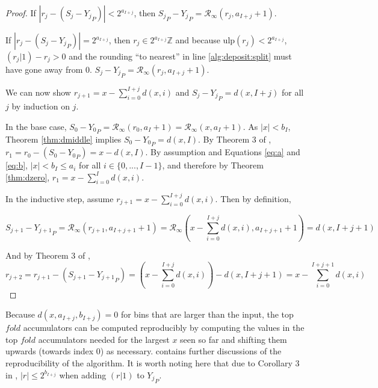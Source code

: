 \documentclass[12pt]{article}
\providecommand{\Z}{\ensuremath{\mathbb{Z}}}
\providecommand{\ulp}{\ensuremath{\text{ulp}}}
\providecommand{\roundtonearestinfty}{\ensuremath{\mathcal{R}_\text{$\infty$}}}
\theoremstyle{plain}
\numberwithin{equation}{section}
\begin{document}
\begin{proof}
        If $|r_j - (S_j - {Y_j}_P)| < 2^{a_{I + j}}$, then ${S_j}_P - {Y_j}_P = \roundtonearestinfty(r_j, a_{I + j} + 1)$.

        If $|r_j - (S_j - {Y_j}_P)| = 2^{a_{I + j}}$, then $r_j \in 2^{a_{I + j}}\Z$ and because $\ulp(r_j) < 2^{a_{I + j}}$, $(r_j | 1) - r_j > 0$ and the rounding ``to nearest'' in line \ref{alg:deposit:split} must have gone away from 0. $S_j - {Y_j}_P = \roundtonearestinfty(r_j, a_{I + j} + 1)$.

        We can now show $r_{j + 1} = x - \sum\limits_{i = 0}^{I + j}d(x, i)$ and $S_j - {Y_j}_P = d(x, I + j)$ for all $j$ by induction on $j$.

        In the base case, $S_0 - {Y_0}_P = \roundtonearestinfty(r_0, a_I + 1) = \roundtonearestinfty(x, a_I + 1)$. As $|x| < b_I$, Theorem \ref{thm:dmiddle} implies $S_0 - {Y_0}_P = d(x, I)$. By Theorem 3 of \cite{repsum}, $r_1 = r_0 - (S_0 - {Y_0}_P) = x - d(x,I)$. By assumption and Equations \ref{eq:a} and \ref{eq:b}, $|x| < b_I \leq a_{i}$ for all $i \in \{0, ..., I - 1\}$, and therefore by Theorem \ref{thm:dzero}, $r_1 = x - \sum\limits_{i = 0}^Id(x, i)$.

        In the inductive step, assume $r_{j + 1} = x - \sum\limits_{i = 0}^{I + j}d(x, i)$. Then by definition,

        \begin{equation*}
          S_{j + 1} - {Y_{j + 1}}_P = \roundtonearestinfty(r_{j + 1}, a_{I + j + 1} + 1) = \roundtonearestinfty(x - \sum\limits_{i = 0}^{I + j}d(x, i), a_{I + j + 1} + 1) = d(x, I + j + 1)
        \end{equation*}

        And by Theorem 3 of \cite{repsum},
        \begin{equation*}
          r_{j + 2} = r_{j + 1} - (S_{j + 1} - {Y_{j + 1}}_P) = (x - \sum\limits_{i = 0}^{I + j}d(x, i)) - d(x, I + j + 1) = x - \sum\limits_{i = 0}^{I + j + 1}d(x, i)
        \end{equation*}
      \end{proof}

      Because $d(x, a_{I + j}, b_{I + j}) = 0$ for bins that are larger than the input, the top $fold$ accumulators can be computed reproducibly by computing the values in the top $fold$ accumulators needed for the largest $x$ seen so far and shifting them upwards (towards index $0$) as necessary. \cite{repsum} contains further discussions of the reproducibility of the algorithm.
      It is worth noting here that due to Corollary $3$ in \cite{repsum}, $|r| \leq 2^{b_{I + j}}$ when adding $(r | 1)$ to ${Y_j}_P$.
\end{document}
